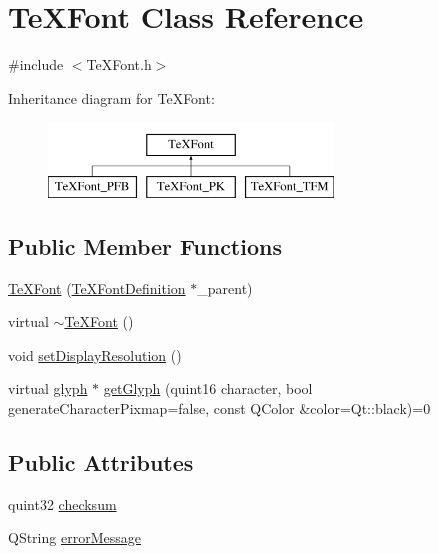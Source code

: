 \hypertarget{classTeXFont}{\section{Te\+X\+Font Class Reference}
\label{classTeXFont}
}


{\ttfamily \#include $<$Te\+X\+Font.\+h$>$}

Inheritance diagram for Te\+X\+Font\+:\begin{figure}[H]
\begin{center}
\leavevmode
\includegraphics[height=2.000000cm]{classTeXFont}
\end{center}
\end{figure}
\subsection*{Public Member Functions}
\begin{DoxyCompactItemize}
\item 
\hyperlink{classTeXFont_ac61cef23719a7d5e79b1c7fa09935b35}{Te\+X\+Font} (\hyperlink{classTeXFontDefinition}{Te\+X\+Font\+Definition} $\ast$\+\_\+parent)
\item 
virtual \hyperlink{classTeXFont_a995a0a4b9154f5239a2ca3565c56f4fb}{$\sim$\+Te\+X\+Font} ()
\item 
void \hyperlink{classTeXFont_aecb5ab55908369eb7b96f84b91771593}{set\+Display\+Resolution} ()
\item 
virtual \hyperlink{classglyph}{glyph} $\ast$ \hyperlink{classTeXFont_a5c4953623f686aac4ec09981cf2680cf}{get\+Glyph} (quint16 character, bool generate\+Character\+Pixmap=false, const Q\+Color \&color=Qt\+::black)=0
\end{DoxyCompactItemize}
\subsection*{Public Attributes}
\begin{DoxyCompactItemize}
\item 
quint32 \hyperlink{classTeXFont_a7bd82a10157e19f7e7534fdc386d2421}{checksum}
\item 
Q\+String \hyperlink{classTeXFont_a97c5eee8ad11d2f8f52797468268d1a4}{error\+Message}
\end{DoxyCompactItemize}
